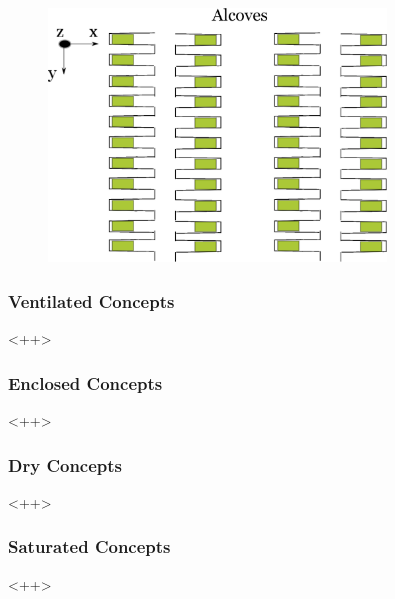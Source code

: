 \begin{frame}
\begin{minipage}{0.49\textwidth}
\begin{figure}[h!]
    \end{figure}
    \begin{figure}[h!]
      \includegraphics[width=0.8\textwidth]{alcoves.eps}
    \end{figure}
  \end{minipage}

\end{frame}

\begin{frame}[ctb!]
  \footnotesize{
  \frametitle{Ventilated Concepts}
  <++>
}
\end{frame}

\begin{frame}[ctb!]
  \footnotesize{
  \frametitle{Enclosed Concepts}
  <++>
}
\end{frame}

\begin{frame}[ctb!]
  \footnotesize{
  \frametitle{Dry Concepts}
  <++>
}
\end{frame}

\begin{frame}[ctb!]
  \footnotesize{
  \frametitle{Saturated Concepts}
  <++>
}
\end{frame}



